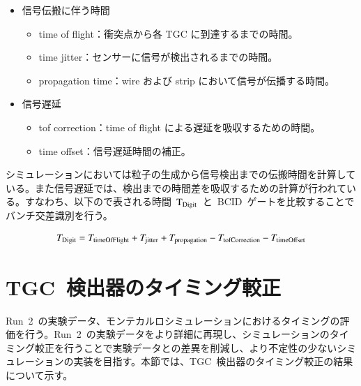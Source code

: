 \begin{itemize}
\item 信号伝搬に伴う時間
\begin{itemize}
\item time of flight：衝突点から各 TGC に到達するまでの時間。
\item time jitter：センサーに信号が検出されるまでの時間。
\item propagation time：wire および strip において信号が伝播する時間。
\end{itemize}
\end{itemize}
\begin{itemize}
\item 信号遅延
\begin{itemize}
\item tof correction：time of flight による遅延を吸収するための時間。
\item time offset：信号遅延時間の補正。
\end{itemize}
\end{itemize}

シミュレーションにおいては粒子の生成から信号検出までの伝搬時間を計算している。また信号遅延では、検出までの時間差を吸収するための計算が行われている。すなわち、以下ので表される時間~$\rm{T_{Digit}}$~と~BCID~ゲートを比較することでバンチ交差識別を行う。

\begin{align}
    \it{T_{\rm{Digit}}=T_{\rm{timeOfFlight}}+T_{\rm{jitter}}+T_{\rm{propagation}}-T_{\rm{tofCorrection}}-T_{\rm{timeOffset}}}
    \label{eq:tdigit}
\end{align}

\section{TGC~検出器のタイミング較正}
Run~2~の実験データ、モンテカルロシミュレーションにおけるタイミングの評価を行う。Run~2~の実験データをより詳細に再現し、シミュレーションのタイミング較正を行うことで実験データとの差異を削減し、より不定性の少ないシミュレーションの実装を目指す。本節では、TGC~検出器のタイミング較正の結果について示す。

